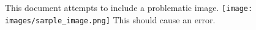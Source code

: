 \documentclass{article}
\begin{document}
This document attempts to include a problematic image.
\texttt{[image: images/sample\_image.png]}
This should cause an error.
\end{document}

